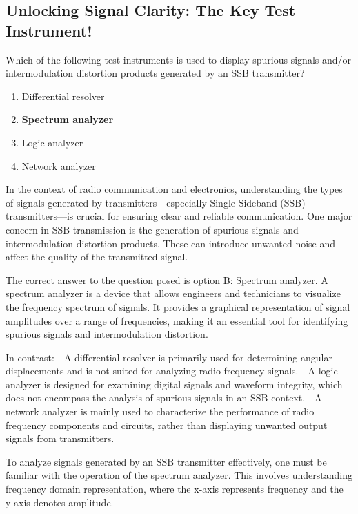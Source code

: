 \subsection{Unlocking Signal Clarity: The Key Test Instrument!}

\begin{tcolorbox}[colback=gray!10, colframe=black, title=E4A03] Which of the following test instruments is used to display spurious signals and/or intermodulation distortion products generated by an SSB transmitter?
\begin{enumerate}[label=\Alph*.]
    \item Differential resolver
    \item \textbf{Spectrum analyzer}
    \item Logic analyzer
    \item Network analyzer
\end{enumerate} \end{tcolorbox}

In the context of radio communication and electronics, understanding the types of signals generated by transmitters—especially Single Sideband (SSB) transmitters—is crucial for ensuring clear and reliable communication. One major concern in SSB transmission is the generation of spurious signals and intermodulation distortion products. These can introduce unwanted noise and affect the quality of the transmitted signal.

The correct answer to the question posed is option B: Spectrum analyzer. A spectrum analyzer is a device that allows engineers and technicians to visualize the frequency spectrum of signals. It provides a graphical representation of signal amplitudes over a range of frequencies, making it an essential tool for identifying spurious signals and intermodulation distortion. 

In contrast:
- A differential resolver is primarily used for determining angular displacements and is not suited for analyzing radio frequency signals.
- A logic analyzer is designed for examining digital signals and waveform integrity, which does not encompass the analysis of spurious signals in an SSB context.
- A network analyzer is mainly used to characterize the performance of radio frequency components and circuits, rather than displaying unwanted output signals from transmitters.

To analyze signals generated by an SSB transmitter effectively, one must be familiar with the operation of the spectrum analyzer. This involves understanding frequency domain representation, where the x-axis represents frequency and the y-axis denotes amplitude.

